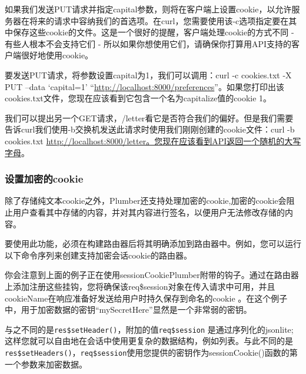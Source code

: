 \documentclass[]{book}
\newenvironment{Shaded}{\begin{snugshade}}{\end{snugshade}}
\newcommand{\KeywordTok}[1]{\textcolor[rgb]{0.13,0.29,0.53}{\textbf{#1}}}
\newcommand{\StringTok}[1]{\textcolor[rgb]{0.31,0.60,0.02}{#1}}
\newcommand{\OperatorTok}[1]{\textcolor[rgb]{0.81,0.36,0.00}{\textbf{#1}}}
\newcommand{\NormalTok}[1]{#1}
\begin{document}
如果我们发送PUT请求并指定capital参数，则将在客户端上设置cookie，以允许服务器在将来的请求中容纳我们的首选项。在curl，您需要使用该-c选项指定要在其中保存这些cookie的文件。这是一个很好的提醒，客户端处理cookie的方式不同
- 有些人根本不会支持它们 -
所以如果你想使用它们，请确保你打算用API支持的客户端很好地使用cookie。

要发送PUT请求，将参数设置capital为1，我们可以调用：curl -c cookies.txt
-X PUT --data `capital=1'
``\url{http://localhost:8000/preferences}''。如果您打印出该cookies.txt文件，您现在应该看到它包含一个名为capitalize值的cookie
1。

我们可以提出另一个GET请求，/letter看它是否符合我们的偏好。但是我们需要告诉curl我们使用-b交换机发送此请求时使用我们刚刚创建的cookie文件：curl
-b cookies.txt
\url{http://localhost:8000/letter。您现在应该看到API返回一个随机的大写字母}。

\subsubsection{设置加密的cookie}\label{cookie}

除了存储纯文本cookie之外，Plumber还支持处理加密的cookie,加密的cookie会阻止用户查看其中存储的内容，并对其内容进行签名，以便用户无法修改存储的内容。

要使用此功能，必须在构建路由器后将其明确添加到路由器中。例如，您可以运行以下命令序列来创建支持加密会话cookie的路由器。

\begin{Shaded}
\end{Shaded}

你会注意到上面的例子正在使用sessionCookiePlumber附带的钩子。通过在路由器上添加注册这些挂钩，您将确保该req\$session对象在传入请求中可用，并且cookieName在响应准备好发送给用户时持久保存到命名的cookie
。在这个例子中，用于加密数据的密钥``mySecretHere''显然是一个非常弱的密钥。

与之不同的是\texttt{res\$setHeader()}，附加的值\texttt{req\$session}
是通过序列化的jsonlite;
这样您就可以自由地在会话中使用更复杂的数据结构，例如列表。与此不同的是\texttt{res\$setHeaders()}，\texttt{req\$session}使用您提供的密钥作为sessionCookie()函数的第一个参数来加密数据。
\end{document}
